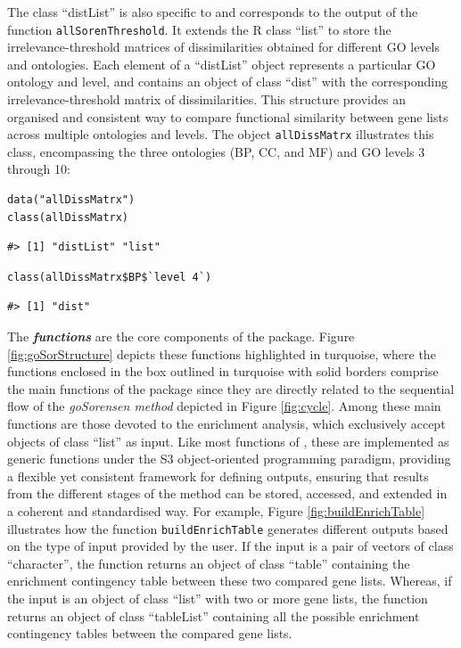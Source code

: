 The class ``distList'' is also specific to  and corresponds to the output of the function \texttt{allSorenThreshold}. It extends the R class ``list'' to store the irrelevance-threshold matrices of dissimilarities obtained for different GO levels and ontologies. Each element of a ``distList'' object represents a particular GO ontology and level, and contains an object of class ``dist'' with the corresponding irrelevance-threshold matrix of dissimilarities. This structure provides an organised and consistent way to compare functional similarity between gene lists across multiple ontologies and levels. The object \texttt{allDissMatrx} illustrates this class, encompassing the three ontologies (BP, CC, and MF) and GO levels 3 through 10:

\begin{verbatim}
data("allDissMatrx")
class(allDissMatrx)
\end{verbatim}

\begin{verbatim}
#> [1] "distList" "list"
\end{verbatim}

\begin{verbatim}
class(allDissMatrx$BP$`level 4`)
\end{verbatim}

\begin{verbatim}
#> [1] "dist"
\end{verbatim}

The  \textbf{\emph{functions}} are the core components of the package. Figure \ref{fig:goSorStructure} depicts these functions highlighted in turquoise, where the functions enclosed in the box outlined in turquoise with solid borders comprise the main functions of the package since they are directly related to the sequential flow of the \emph{goSorensen method} depicted in Figure \ref{fig:cycle}. Among these main functions are those devoted to the enrichment analysis, which exclusively accept objects of class ``list'' as input. Like most functions of , these are implemented as generic functions under the S3 object-oriented programming paradigm, providing a flexible yet consistent framework for defining outputs, ensuring that results from the different stages of the method can be stored, accessed, and extended in a coherent and standardised way. For example, Figure \ref{fig:buildEnrichTable} illustrates how the function \texttt{buildEnrichTable} generates different outputs based on the type of input provided by the user. If the input is a pair of vectors of class ``character'', the function returns an object of class ``table'' containing the enrichment contingency table between these two compared gene lists. Whereas, if the input is an object of class ``list'' with two or more gene lists, the function returns an object of class ``tableList'' containing all the possible enrichment contingency tables between the compared gene lists.

